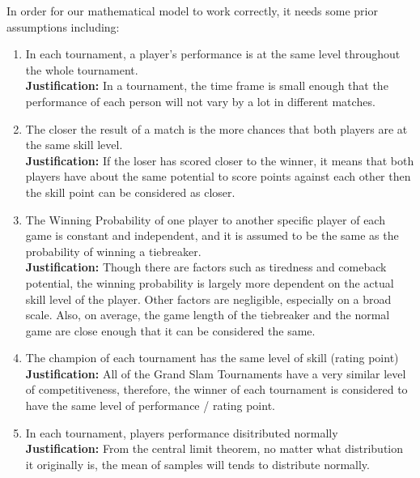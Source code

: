 In order for our mathematical model to work correctly, it needs some prior assumptions including:
\begin{enumerate}
    \item In each tournament, a player's performance is at the same level throughout the whole tournament. \label{as_stable}
    \\ \textbf{Justification:} In a tournament, the time frame is small enough that the performance of each person will not vary by a lot in different matches. %
    
    \item The closer the result of a match is the more chances that both players are at the same skill level. \label{as_close}
    \\ \textbf{Justification:} If the loser has scored closer to the winner, it means that both players have about the same potential to score points against each other then the skill point can be considered as closer. %
    
    \item The Winning Probability of one player to another specific player of each game is constant and independent, and it is assumed to be the same as the probability of winning a tiebreaker. \label{as_gamewin}
    \\ \textbf{Justification:} Though there are factors such as tiredness and comeback potential, the winning probability is largely more dependent on the actual skill level of the player. Other factors are negligible, especially on a broad scale. Also, on average, the game length of the tiebreaker and the normal game are close enough that it can be considered the same. %
    
    \item The champion of each tournament has the same level of skill (rating point) \label{as_champion}
    \\ \textbf{Justification:} All of the Grand Slam Tournaments have a very similar level of competitiveness, therefore, the winner of each tournament is considered to have the same level of performance / rating point. %
    
    \item In each tournament, players performance disitributed normally \label{as_normal}
    \\ \textbf{Justification:} From the central limit theorem, no matter what distribution it originally is, the mean of samples will tends to distribute normally. %
    

\end{enumerate}
